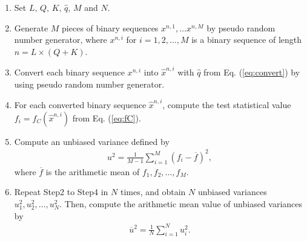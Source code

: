 \documentclass[dvipdfmx,english]{ampmt} %
\begin{document}
\begin{enumerate}[Step1:]
  \item Set $L,\,Q,\,K,\,\hat{q},\,M$ and $N$.
  \item Generate $M$ pieces of binary sequences $x^{n,1},\dots x^{n,M}$ by pseudo random number generator, where $x^{n,i}$ for $i=1,2,\dots,M$ is a binary sequence of length $n=L\times(Q+K)$.
  \item Convert each binary sequence $x^{n,i}$ into $\hat{x}^{n,i}$ with $\hat{q}$ from Eq. (\ref{eq:convert}) by using pseudo random number generator.
  \item For each converted binary sequence $\hat{x}^{n,i}$, compute the test statistical value $f_i=f_C(\hat{x}^{n,i})$ from Eq. (\ref{eq:fC}).
  \item Compute an unbiased variance defined by
  \begin{align}
    u^2 = \frac{1}{M-1}\sum_{i=1}^{M}(f_i - \overline{f})^2,
  \end{align}
  where $\overline{f}$ is the arithmetic mean of $f_1,f_2,\dots,f_M$.
  \item Repeat Step2 to Step4 in $N$ times, and obtain $N$ unbiased variances $u_1^2,u_2^2,\dots,u_N^2$. Then, compute the arithmetic mean value of unbiased variances by
  \begin{align}
    \overline{u}^2 = \frac{1}{N} \sum_{i=1}^{N} u_i^2.
  \end{align}
\end{enumerate}
%
\end{document}
